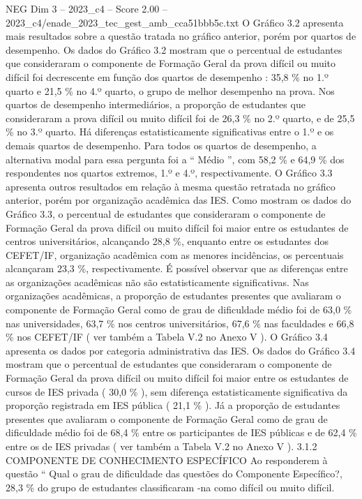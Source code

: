 \begin{textsample}{NEG Dim 3 – 2023\_c4 – Score 2.00 – 2023\_c4/enade\_2023\_tec\_gest\_amb\_cca51bbb5c.txt}
O Gráfico 3.2 apresenta mais resultados sobre a questão tratada no gráfico anterior, porém por quartos de desempenho.
Os dados do Gráfico 3.2 mostram que o percentual de estudantes que consideraram o componente de Formação Geral da prova difícil ou muito difícil foi decrescente em função dos quartos de desempenho : 35,8 \% no 1.º quarto e 21,5 \% no 4.º quarto, o grupo de melhor desempenho na prova.
Nos quartos de desempenho intermediários, a proporção de estudantes que consideraram a prova difícil ou muito difícil foi de 26,3 \% no 2.º quarto, e de 25,5 \% no 3.º quarto.
Há diferenças estatisticamente significativas entre o 1.º e os demais quartos de desempenho.
Para todos os quartos de desempenho, a alternativa modal para essa pergunta foi a “ Médio ”, com 58,2 \% e 64,9 \% dos respondentes nos quartos extremos, 1.º e 4.º, respectivamente.
O Gráfico 3.3 apresenta outros resultados em relação à mesma questão retratada no gráfico anterior, porém por organização acadêmica das IES.
Como mostram os dados do Gráfico 3.3, o percentual de estudantes que consideraram o componente de Formação Geral da prova difícil ou muito difícil foi maior entre os estudantes de centros universitários, alcançando 28,8 \%, enquanto entre os estudantes dos CEFET/IF, organização acadêmica com as menores incidências, os percentuais alcançaram 23,3 \%, respectivamente.
É possível observar que as diferenças entre as organizações acadêmicas não são estatisticamente significativas.
Nas organizações acadêmicas, a proporção de estudantes presentes que avaliaram o componente de Formação Geral como de grau de dificuldade médio foi de 63,0 \% nas universidades, 63,7 \% nos centros universitários, 67,6 \% nas faculdades e 66,8 \% nos CEFET/IF ( ver também a Tabela V.2 no Anexo V ).
O Gráfico 3.4 apresenta os dados por categoria administrativa das IES.
Os dados do Gráfico 3.4 mostram que o percentual de estudantes que consideraram o componente de Formação Geral da prova difícil ou muito difícil foi maior entre os estudantes de cursos de IES privada ( 30,0 \% ), sem diferença estatisticamente significativa da proporção registrada em IES pública ( 21,1 \% ).
Já a proporção de estudantes presentes que avaliaram o componente de Formação Geral como de grau de dificuldade médio foi de 68,4 \% entre os participantes de IES públicas e de 62,4 \% entre os de IES privadas ( ver também a Tabela V.2 no Anexo V ). 3.1.2 COMPONENTE DE CONHECIMENTO ESPECÍFICO Ao responderem à questão “ Qual o grau de dificuldade das questões do Componente Específico?, 28,3 \% do grupo de estudantes classificaram -na como difícil ou muito difícil.

\end{textsample}

